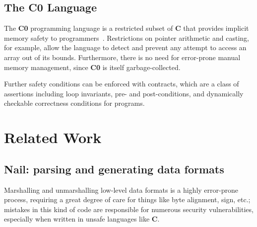 \documentclass{article}
\newcommand\Kwd[1]{{\sffamily\bfseries{#1}}}
\begin{document}
\subsection*{The \Kwd{C0} Language}\label{sec:c0}

The \Kwd{C0} programming language is a restricted subset of \Kwd{C}
that provides implicit memory safety to
programmers~\citep{pfenning:c0-reference}. Restrictions on pointer
arithmetic and casting, for example, allow the language to detect and
prevent any attempt to access an array out of its bounds. Furthermore,
there is no need for error-prone manual memory management, since
\Kwd{C0} is itself garbage-collected.

Further safety conditions can be enforced with contracts, which are a
class of assertions including loop invariants, pre- and
post-conditions, and dynamically checkable correctness conditions for
programs.





\section{Related Work}

\subsection*{Nail: parsing and generating data formats}

Marshalling and unmarshalling low-level data formats
is a highly error-prone process, requiring a great degree of care for
things like byte alignment, sign, etc.; mistakes in this kind of code
are responsible for numerous security vulnerabilities, especially when
written in unsafe languages like \Kwd{C}.
\end{document}

